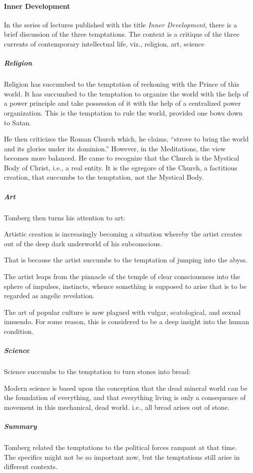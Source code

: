 \paragraph{Inner Development}
In the series of lectures published with the title \emph{Inner Development}, there is a brief discussion of the three temptations. The context is a critique of the three currents of contemporary intellectual life, viz., religion, art, science

\subparagraph{Religion}
Religion has succumbed to the temptation of reckoning with the Prince of this world. It has succumbed to the temptation to organize the world with the help of a power principle and take possession of it with the help of a centralized power organization. This is the temptation to rule the world, provided one bows down to Satan.

He then criticizes the Roman Church which, he claims, “strove to bring the world and its glories under its dominion.” However, in the Meditations, the view becomes more balanced.  He came to recognize that the Church is the Mystical Body of Christ, i.e., a real entity. It is the egregore of the Church, a factitious creation, that succumbs to the temptation, not the Mystical Body.

\subparagraph{Art}
Tomberg then turns his attention to art:

\begin{quotex}
Artistic creation is increasingly becoming a situation whereby the artist creates out of the deep dark underworld of his subconscious. 

\end{quotex}
That is because the artist succumbs to the temptation of jumping into the abyss.

\begin{quotex}
The artist leaps from the pinnacle of the temple of clear consciousness into the sphere of impulses, instincts, whence something is supposed to arise that is to be regarded as angelic revelation. 

\end{quotex}
The art of popular culture is now plagued with vulgar, scatological, and sexual innuendo. For some reason, this is considered to be a deep insight into the human condition.

\subparagraph{Science}
Science succumbs to the temptation to turn stones into bread:

\begin{quotex}
Modern science is based upon the conception that the dead mineral world can be the foundation of everything, and that everything living is only a consequence of movement in this mechanical, dead world. i.e., all bread arises out of stone. 

\end{quotex}
\subparagraph{Summary}
Tomberg related the temptations to the political forces rampant at that time. The specifics might not be so important now, but the temptations still arise in different contexts.

